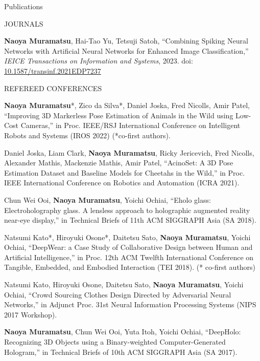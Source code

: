\documentclass{resume} %
\begin{document}

\begin{rSection}{Publications} \itemsep 4pt

    \begin{rSubsection}{JOURNALS}{}{}{}{}
        \item \textbf{Naoya Muramatsu}, Hai-Tao Yu, Tetsuji Satoh, ``Combining Spiking Neural Networks with Artificial Neural Networks for Enhanced Image Classification,'' \textit{IEICE Transactions on Information and Systems}, 2023. doi: \url{10.1587/transinf.2021EDP7237}
    \end{rSubsection}

    \begin{rSubsection}{REFEREED CONFERENCES}{}{}{}{}
        \item \textbf{Naoya Muramatsu}*, Zico da Silva*, Daniel Joska, Fred Nicolls, Amir Patel, ``Improving 3D Markerless Pose Estimation of Animals in the Wild using Low-Cost Cameras,'' in Proc. IEEE/RSJ International Conference on Intelligent Robots and Systems (IROS 2022) (*co-first authors).
        \item Daniel Joska, Liam Clark, \textbf{Naoya Muramatsu}, Ricky Jericevich, Fred Nicolls, Alexander Mathis, Mackenzie Mathis, Amir Patel, ``AcinoSet: A 3D Pose Estimation Dataset and Baseline Models for Cheetahs in the Wild,'' in Proc. IEEE International Conference on Robotics and Automation (ICRA 2021).
        \item Chun Wei Ooi, \textbf{Naoya Muramatsu}, Yoichi Ochiai, ``Eholo glass: Electroholography glass. A lensless approach to holographic augmented reality near-eye display,'' in Technical Briefs of 11th ACM SIGGRAPH Asia (SA 2018).
        \item Natsumi Kato*, Hiroyuki Osone*, Daitetsu Sato, \textbf{Naoya Muramatsu}, Yoichi Ochiai, ``DeepWear: a Case Study of Collaborative Design between Human and Artificial Intelligence,''  in Proc. 12th ACM Twelfth International Conference on Tangible, Embedded, and Embodied Interaction (TEI 2018). (* co-first authors)
        \item Natsumi Kato, Hiroyuki Osone, Daitetsu Sato, \textbf{Naoya Muramatsu}, Yoichi Ochiai, ``Crowd Sourcing Clothes Design Directed by Adversarial Neural Networks,'' in  Adjunct Proc. 31st Neural Information Processing Systems (NIPS 2017 Workshop).
        \item \textbf{Naoya Muramatsu}, Chun Wei Ooi, Yuta Itoh, Yoichi Ochiai, ``DeepHolo: Recognizing 3D Objects using a Binary-weighted Computer-Generated Hologram,'' in Technical Briefs of 10th ACM SIGGRAPH Asia (SA 2017).

\end{rSubsection}
\end{rSection}
\end{document}
